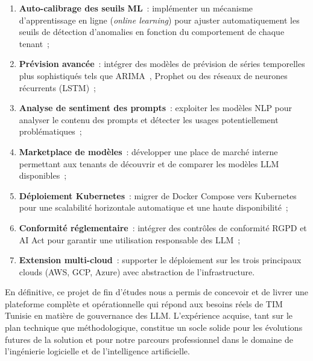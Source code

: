 \begin{enumerate}[noitemsep]
    \item \textbf{Auto-calibrage des seuils ML}~: implémenter un mécanisme d'apprentissage en ligne (\textit{online learning}) pour ajuster automatiquement les seuils de détection d'anomalies en fonction du comportement de chaque tenant~;
    \item \textbf{Prévision avancée}~: intégrer des modèles de prévision de séries temporelles plus sophistiqués tels que ARIMA~\cite{box2015}, Prophet ou des réseaux de neurones récurrents (LSTM)~;
    \item \textbf{Analyse de sentiment des prompts}~: exploiter les modèles NLP pour analyser le contenu des prompts et détecter les usages potentiellement problématiques~;
    \item \textbf{Marketplace de modèles}~: développer une place de marché interne permettant aux tenants de découvrir et de comparer les modèles LLM disponibles~;
    \item \textbf{Déploiement Kubernetes}~: migrer de Docker Compose vers Kubernetes pour une scalabilité horizontale automatique et une haute disponibilité~;
    \item \textbf{Conformité réglementaire}~: intégrer des contrôles de conformité RGPD et AI Act pour garantir une utilisation responsable des LLM~;
    \item \textbf{Extension multi-cloud}~: supporter le déploiement sur les trois principaux clouds (AWS, GCP, Azure) avec abstraction de l'infrastructure.
\end{enumerate}

\vspace{0.5cm}

En définitive, ce projet de fin d'études nous a permis de concevoir et de livrer une plateforme complète et opérationnelle qui répond aux besoins réels de TIM Tunisie en matière de gouvernance des LLM. L'expérience acquise, tant sur le plan technique que méthodologique, constitue un socle solide pour les évolutions futures de la solution et pour notre parcours professionnel dans le domaine de l'ingénierie logicielle et de l'intelligence artificielle.
